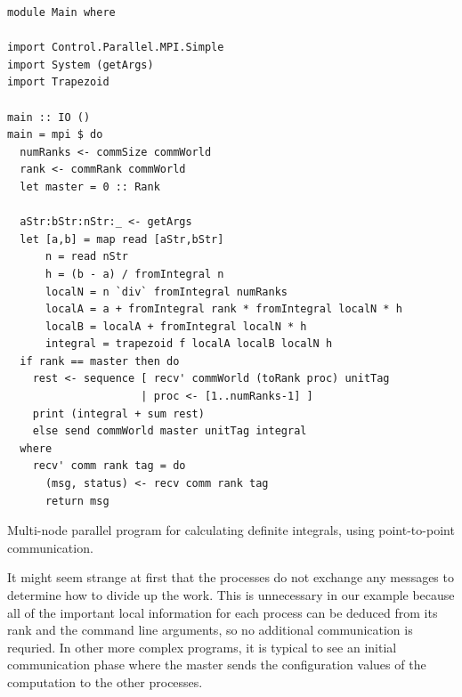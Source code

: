 \documentclass{tmr}
\newcommand{\Todo}[1]{{\textbf{Todo: #1}}}
\begin{document}
\begin{listing}
\begin{Verbatim}
module Main where

import Control.Parallel.MPI.Simple
import System (getArgs)
import Trapezoid

main :: IO ()
main = mpi $ do
  numRanks <- commSize commWorld
  rank <- commRank commWorld
  let master = 0 :: Rank

  aStr:bStr:nStr:_ <- getArgs
  let [a,b] = map read [aStr,bStr]
      n = read nStr
      h = (b - a) / fromIntegral n
      localN = n `div` fromIntegral numRanks
      localA = a + fromIntegral rank * fromIntegral localN * h
      localB = localA + fromIntegral localN * h
      integral = trapezoid f localA localB localN h
  if rank == master then do
    rest <- sequence [ recv' commWorld (toRank proc) unitTag
                     | proc <- [1..numRanks-1] ]
    print (integral + sum rest)
    else send commWorld master unitTag integral
  where
    recv' comm rank tag = do
      (msg, status) <- recv comm rank tag
      return msg
\end{Verbatim}
\caption{Multi-node parallel program for calculating definite
  integrals, using point-to-point communication. \label{mpi-p2p}}
\end{listing}


It might seem strange at first that the processes do not exchange any
messages to determine how to divide up the work.
This is unnecessary in our example because all of the important
local information for each process can be deduced from its rank and
the command line arguments, so no additional communication is requried.
In other more complex programs, it is typical to see
an initial communication phase where the master sends the configuration
values of the computation to the other processes.
\end{document}
